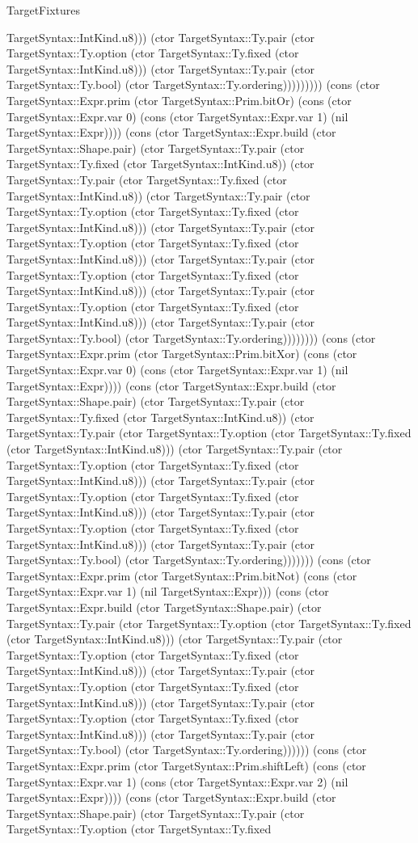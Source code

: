 \begin{lexlean}{TargetFixtures}
\begin{semanticmodule}
{TargetSyntax::IntKind.u8))) (ctor TargetSyntax::Ty.pair (ctor TargetSyntax::Ty.option (ctor TargetSyntax::Ty.fixed (ctor TargetSyntax::IntKind.u8))) (ctor TargetSyntax::Ty.pair (ctor TargetSyntax::Ty.bool) (ctor TargetSyntax::Ty.ordering))))))))) (cons (ctor TargetSyntax::Expr.prim (ctor TargetSyntax::Prim.bitOr) (cons (ctor TargetSyntax::Expr.var 0) (cons (ctor TargetSyntax::Expr.var 1) (nil TargetSyntax::Expr)))) (cons (ctor TargetSyntax::Expr.build (ctor TargetSyntax::Shape.pair) (ctor TargetSyntax::Ty.pair (ctor TargetSyntax::Ty.fixed (ctor TargetSyntax::IntKind.u8)) (ctor TargetSyntax::Ty.pair (ctor TargetSyntax::Ty.fixed (ctor TargetSyntax::IntKind.u8)) (ctor TargetSyntax::Ty.pair (ctor TargetSyntax::Ty.option (ctor TargetSyntax::Ty.fixed (ctor TargetSyntax::IntKind.u8))) (ctor TargetSyntax::Ty.pair (ctor TargetSyntax::Ty.option (ctor TargetSyntax::Ty.fixed (ctor TargetSyntax::IntKind.u8))) (ctor TargetSyntax::Ty.pair (ctor TargetSyntax::Ty.option (ctor TargetSyntax::Ty.fixed (ctor TargetSyntax::IntKind.u8))) (ctor TargetSyntax::Ty.pair (ctor TargetSyntax::Ty.option (ctor TargetSyntax::Ty.fixed (ctor TargetSyntax::IntKind.u8))) (ctor TargetSyntax::Ty.pair (ctor TargetSyntax::Ty.bool) (ctor TargetSyntax::Ty.ordering)))))))) (cons (ctor TargetSyntax::Expr.prim (ctor TargetSyntax::Prim.bitXor) (cons (ctor TargetSyntax::Expr.var 0) (cons (ctor TargetSyntax::Expr.var 1) (nil TargetSyntax::Expr)))) (cons (ctor TargetSyntax::Expr.build (ctor TargetSyntax::Shape.pair) (ctor TargetSyntax::Ty.pair (ctor TargetSyntax::Ty.fixed (ctor TargetSyntax::IntKind.u8)) (ctor TargetSyntax::Ty.pair (ctor TargetSyntax::Ty.option (ctor TargetSyntax::Ty.fixed (ctor TargetSyntax::IntKind.u8))) (ctor TargetSyntax::Ty.pair (ctor TargetSyntax::Ty.option (ctor TargetSyntax::Ty.fixed (ctor TargetSyntax::IntKind.u8))) (ctor TargetSyntax::Ty.pair (ctor TargetSyntax::Ty.option (ctor TargetSyntax::Ty.fixed (ctor TargetSyntax::IntKind.u8))) (ctor TargetSyntax::Ty.pair (ctor TargetSyntax::Ty.option (ctor TargetSyntax::Ty.fixed (ctor TargetSyntax::IntKind.u8))) (ctor TargetSyntax::Ty.pair (ctor TargetSyntax::Ty.bool) (ctor TargetSyntax::Ty.ordering))))))) (cons (ctor TargetSyntax::Expr.prim (ctor TargetSyntax::Prim.bitNot) (cons (ctor TargetSyntax::Expr.var 1) (nil TargetSyntax::Expr))) (cons (ctor TargetSyntax::Expr.build (ctor TargetSyntax::Shape.pair) (ctor TargetSyntax::Ty.pair (ctor TargetSyntax::Ty.option (ctor TargetSyntax::Ty.fixed (ctor TargetSyntax::IntKind.u8))) (ctor TargetSyntax::Ty.pair (ctor TargetSyntax::Ty.option (ctor TargetSyntax::Ty.fixed (ctor TargetSyntax::IntKind.u8))) (ctor TargetSyntax::Ty.pair (ctor TargetSyntax::Ty.option (ctor TargetSyntax::Ty.fixed (ctor TargetSyntax::IntKind.u8))) (ctor TargetSyntax::Ty.pair (ctor TargetSyntax::Ty.option (ctor TargetSyntax::Ty.fixed (ctor TargetSyntax::IntKind.u8))) (ctor TargetSyntax::Ty.pair (ctor TargetSyntax::Ty.bool) (ctor TargetSyntax::Ty.ordering)))))) (cons (ctor TargetSyntax::Expr.prim (ctor TargetSyntax::Prim.shiftLeft) (cons (ctor TargetSyntax::Expr.var 1) (cons (ctor TargetSyntax::Expr.var 2) (nil TargetSyntax::Expr)))) (cons (ctor TargetSyntax::Expr.build (ctor TargetSyntax::Shape.pair) (ctor TargetSyntax::Ty.pair (ctor TargetSyntax::Ty.option (ctor TargetSyntax::Ty.fixed }
\end{semanticmodule}
\end{lexlean}
